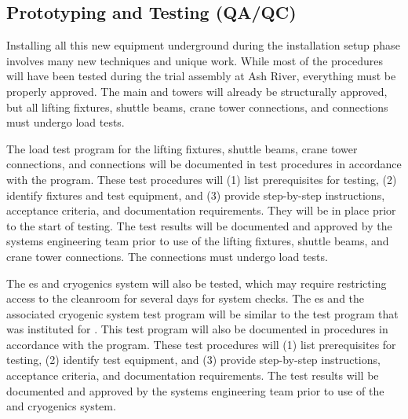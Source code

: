 \clearpage 

\subsection{Prototyping and Testing (QA/QC)}
\label{sec:fdsp-tc-infr-qaqc}


Installing all this new equipment underground during the installation setup phase involves many new techniques  and unique work. While most of the procedures will have been tested during the trial assembly at Ash River, everything must be properly approved. The main  and  towers will already be structurally approved, but all lifting fixtures, shuttle beams, crane tower connections, and \coldbox connections must undergo load tests. 


The load test program for the lifting fixtures, shuttle beams, crane tower connections, and \coldbox connections will be documented in test procedures in accordance with the    program.  
These test procedures will (1) list prerequisites for testing, (2) identify fixtures and test equipment, and (3) provide step-by-step instructions, acceptance criteria, and documentation requirements.
They will be in place prior to the start of testing. 
The test results will be documented and approved by the systems engineering team prior to use of the lifting fixtures, shuttle beams, and crane tower connections. The \coldbox connections must undergo load tests. 

The \coldbox{}es and cryogenics system will also be tested, which may require restricting  access to the cleanroom  %
for several days for system checks. 
The \coldbox{}es and the associated cryogenic system test program will be similar to the test program that was instituted for . 
This test program will also be documented in procedures in accordance with the    program. %
These test procedures will (1) list prerequisites for testing, (2) identify test equipment, and (3) provide step-by-step instructions, acceptance criteria, and documentation requirements.
 The test results will be documented and approved by the systems engineering team prior to use of the \coldbox and cryogenics system.

